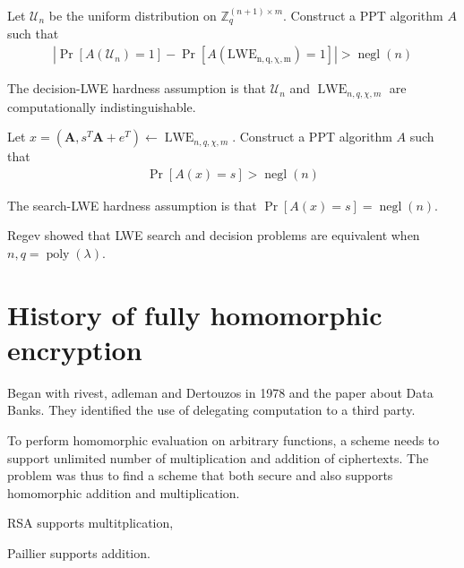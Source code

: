 \begin{definition}
    Let $\mathcal{U}_n$ be the uniform distribution on $\mathbb{Z}_q^{(n+1) \times m}$. Construct a PPT algorithm $A$ such that 
    \begin{equation*}
        \begin{aligned}
        |\operatorname{Pr}[A(\mathcal{U}_n) = 1] - \operatorname{Pr}[A(\operatorname{LWE_{n,q,\chi,m}}) = 1]| > \operatorname{negl}(n)
        \end{aligned}
    \end{equation*}
\end{definition}
The decision-LWE hardness assumption is that $\mathcal{U}_n$ and $\operatorname{LWE}_{n,q,\chi,m}$ are computationally indistinguishable.
\begin{definition}
    Let $x = (\textbf{A}, s^T\textbf{A}+e^T) \leftarrow \operatorname{LWE}_{n,q,\chi,m}$. Construct a PPT algorithm $A$ such that 
    \begin{equation*}
        \begin{aligned}
            \operatorname{Pr}[A(x) = s] > \operatorname{negl}(n)
        \end{aligned}
    \end{equation*}
\end{definition}
The search-LWE hardness assumption is that $\operatorname{Pr}[A(x) = s] = \operatorname{negl}(n)$.

Regev showed that LWE search and decision problems are equivalent when $n, q = \operatorname{poly}(\lambda)$.

\section{History of fully homomorphic encryption}
Began with rivest, adleman and Dertouzos in 1978 and the paper about Data Banks. 
They identified the use of delegating computation to a third party.

To perform homomorphic evaluation on arbitrary functions, a scheme needs to support unlimited number of multiplication and addition of ciphertexts. The problem was thus to find a scheme that both secure and also supports homomorphic addition and multiplication.

RSA supports multitplication,

Paillier supports addition.

